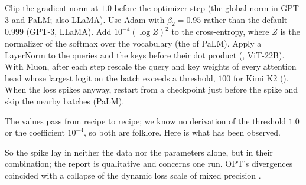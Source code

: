 \begin{refsection}
\begin{practice}
Clip the gradient norm at $1.0$ before the optimizer step (the global norm in GPT-3 and PaLM; also LLaMA). Use Adam with $\beta_2=0.95$ rather than the default $0.999$ (GPT-3, LLaMA). Add $10^{-4}(\log Z)^2$ to the cross-entropy, where $Z$ is the normalizer of the softmax over the vocabulary (the  of PaLM). Apply a LayerNorm to the queries and the keys before their dot product (, ViT-22B). With Muon, after each step rescale the query and key weights of every attention head whose largest logit on the batch exceeds a threshold, $100$ for Kimi K2 (). When the loss spikes anyway, restart from a checkpoint just before the spike and skip the nearby batches (PaLM).
\end{practice}

The values pass from recipe to recipe; we know no derivation of the threshold $1.0$ or the coefficient $10^{-4}$, so both are folklore. Here is what has been observed.


So the spike lay in neither the data nor the parameters alone, but in their combination; the report is qualitative and concerns one run. OPT's divergences coincided with a collapse of the dynamic loss scale of mixed precision \parencite{ZhangEtAl2022OPT}.



\end{refsection}
